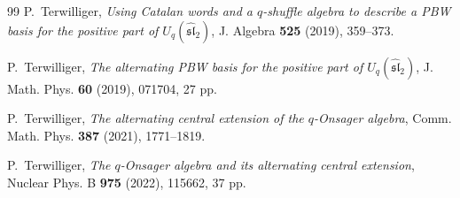 \documentclass[11pt]{extarticle}
\theoremstyle{definition}
\theoremstyle{remark}
\numberwithin{equation}{section}
\begin{document}
\begin{thebibliography}{99}
P.~Terwilliger,
\emph{Using Catalan words and a $q$-shuffle algebra to describe a PBW basis
for the positive part of $U_q(\widehat{\mathfrak{sl}}_2)$},
J. Algebra \textbf{525} (2019), 359--373.

P.~Terwilliger,
\emph{The alternating PBW basis for the positive part of
$U_q(\widehat{\mathfrak{sl}}_2)$},
J. Math. Phys. \textbf{60} (2019), 071704, 27 pp.

P.~Terwilliger,
\emph{The alternating central extension of the $q$-Onsager algebra},
Comm. Math. Phys. \textbf{387} (2021), 1771--1819.

P.~Terwilliger,
\emph{The $q$-Onsager algebra and its alternating central extension},
Nuclear Phys. B \textbf{975} (2022), 115662, 37 pp.


\end{thebibliography}
\end{document}
